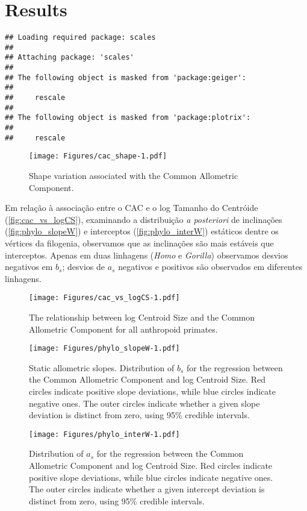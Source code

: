 \documentclass[11pt,twoside]{report}
\begin{document}
\section{Results}\label{results-1}

\begin{verbatim}
## Loading required package: scales
## 
## Attaching package: 'scales'
## 
## The following object is masked from 'package:geiger':
## 
##     rescale
## 
## The following object is masked from 'package:plotrix':
## 
##     rescale
\end{verbatim}

\begin{figure}[htbp]
\centering
\texttt{[image: Figures/cac\_shape-1.pdf]}
\caption{Shape variation associated with the Common Allometric
Component. \label{fig:cac_shape}}
\end{figure}



Em relação à associação entre o CAC e o log Tamanho do Centróide
(\autoref{fig:cac_vs_logCS}), examinando a distribuição \emph{a
posteriori} de inclinações (\autoref{fig:phylo_slopeW}) e interceptos
(\autoref{fig:phylo_interW}) estáticos dentre os vértices da filogenia,
observamos que as inclinações são mais estáveis que interceptos. Apenas
em duas linhagens (\emph{Homo} e \emph{Gorilla}) observamos desvios
negativos em $b_s$; desvios de $a_s$ negativos e positivos são
observados em diferentes linhagens.

\begin{figure}[htbp]
\centering
\texttt{[image: Figures/cac\_vs\_logCS-1.pdf]}
\caption{The relationship between log Centroid Size and the Common
Allometric Component for all anthropoid primates.
\label{fig:cac_vs_logCS}}
\end{figure}

\begin{figure}[htbp]
\centering
\texttt{[image: Figures/phylo\_slopeW-1.pdf]}
\caption{Static allometric slopes. Distribution of $b_s$ for the
regression between the Common Allometric Component and log Centroid
Size. Red circles indicate positive slope deviations, while blue circles
indicate negative ones. The outer circles indicate whether a given slope
deviation is distinct from zero, using 95\% credible intervals.
\label{fig:phylo_slopeW}}
\end{figure}

\begin{figure}[htbp]
\centering
\texttt{[image: Figures/phylo\_interW-1.pdf]}
\caption{Distribution of $a_s$ for the regression between the Common
Allometric Component and log Centroid Size. Red circles indicate
positive slope deviations, while blue circles indicate negative ones.
The outer circles indicate whether a given intercept deviation is
distinct from zero, using 95\% credible intervals.
\label{fig:phylo_interW}}
\end{figure}
\end{document}
